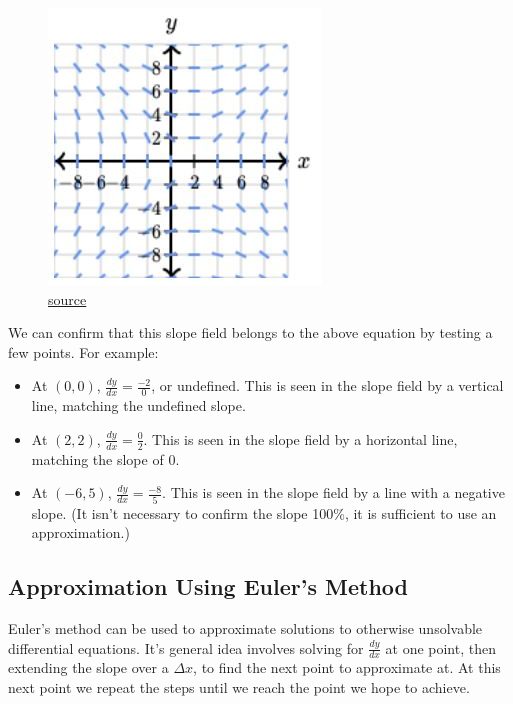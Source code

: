\documentclass[12pt]{article}
\begin{document}
\begin{figure}[H]
	\begin{center}
		\includegraphics{fig13.JPG}
		\caption{\href{https://www.khanacademy.org/math/ap-calculus-bc/bc-differential-equations-new}{source}}
		\label{fig:slopefield1}
	\end{center}
\end{figure}

We can confirm that this slope field belongs to the above equation by testing a few points. For example:
\begin{itemize}
	\item At $(0, 0)$, $\frac{dy}{dx} = \frac{-2}{0}$, or undefined. This is seen in the slope field by a vertical line, matching the undefined slope.
	\item At $(2, 2)$, $\frac{dy}{dx} = \frac{0}{2}$. This is seen in the slope field by a horizontal line, matching the slope of $0$.
	\item At $(-6, 5)$, $\frac{dy}{dx} = \frac{-8}{5}$. This is seen in the slope field by a line with a negative slope. (It isn't necessary to confirm the slope 100\%, it is sufficient to use an approximation.)
\end{itemize}

\subsection{Approximation Using Euler's Method}
Euler's method can be used to approximate solutions to otherwise unsolvable differential equations. It's general idea involves solving for $\frac{dy}{dx}$ at one point, then extending the slope over a $\Delta x$, to find the next point to approximate at. At this next point we repeat the steps until we reach the point we hope to achieve.
\end{document}
